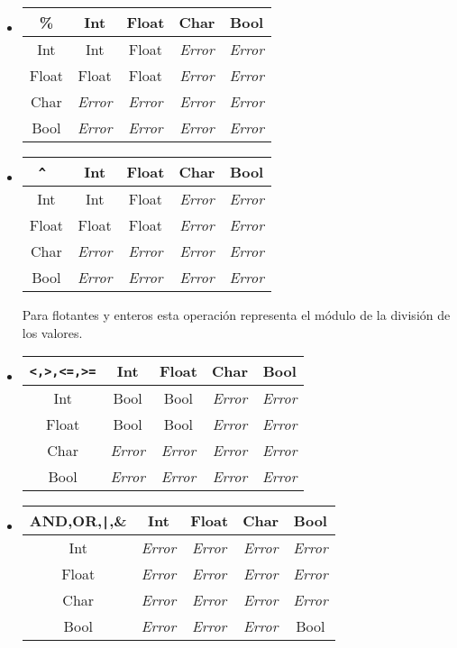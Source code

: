 \documentclass[12pt, spanish]{report}
\begin{document}
\begin{itemize}
\item
\begin{tabular}{|c||cccc|}
	\hline
\%     &  Int  & Float & Char  & Bool  \\
	\hline \hline
Int    &  Int  & Float & \emph{Error} & \emph{Error} \\
Float  & Float & Float & \emph{Error} & \emph{Error} \\
Char   & \emph{Error} & \emph{Error} & \emph{Error} & \emph{Error} \\
Bool   & \emph{Error} & \emph{Error} & \emph{Error} & \emph{Error} \\
	\hline
\end{tabular}

\item
\begin{tabular}{|c||cccc|}
	\hline
\texttt{\^}\     &  Int  & Float & Char  & Bool  \\
	\hline \hline
Int    &  Int  & Float & \emph{Error} & \emph{Error} \\
Float  & Float & Float & \emph{Error} & \emph{Error} \\
Char   & \emph{Error} & \emph{Error} & \emph{Error} & \emph{Error} \\
Bool   & \emph{Error} & \emph{Error} & \emph{Error} & \emph{Error} \\
	\hline
\end{tabular}
Para flotantes y enteros esta operaci\'on representa el m\'odulo de la
divisi\'on de los valores.

\item
\begin{tabular}{|c||cccc|}
	\hline
\texttt{<,>,<=,>=}&  Int  & Float & Char  & Bool  \\
	\hline \hline
Int      &  Bool &  Bool & \emph{Error} & \emph{Error} \\
Float    &  Bool &  Bool & \emph{Error} & \emph{Error} \\
Char     & \emph{Error} & \emph{Error} & \emph{Error} & \emph{Error} \\
Bool     & \emph{Error} & \emph{Error} & \emph{Error} & \emph{Error} \\
	\hline
\end{tabular}

\item
\begin{tabular}{|c||cccc|}
	    \hline
AND,OR,\texttt{|},\& &  Int  & Float & Char  & Bool  \\ 
	    \hline \hline
Int         & \emph{Error} & \emph{Error} & \emph{Error} & \emph{Error} \\
Float       & \emph{Error} & \emph{Error} & \emph{Error} & \emph{Error} \\
Char        & \emph{Error} & \emph{Error} & \emph{Error} & \emph{Error} \\
Bool        & \emph{Error} & \emph{Error} & \emph{Error} & Bool \\
	\hline
\end{tabular}


\end{itemize}
\end{document}

